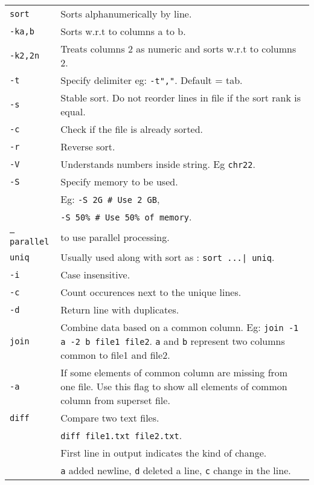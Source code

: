 \begin{tabularx}{\linewidth}{lX}
    \texttt{sort} & Sorts alphanumerically by line.\\
    \texttt{-ka,b} & Sorts w.r.t to columns a to b.\\
    \texttt{-k2,2n} & Treats columns 2 as numeric and sorts w.r.t to columns 2.\\
    \texttt{-t} & Specify delimiter eg: \texttt{-t","}. Default = tab.\\
    \texttt{-s} & Stable sort. Do not reorder lines in file if the sort rank is equal.\\
    \texttt{-c} & Check if the file is already sorted. \\
    \texttt{-r} & Reverse sort.\\
    \texttt{-V} & Understands numbers inside string. Eg \texttt{chr22}.\\
    \texttt{-S} & Specify memory to be used. \\
    & Eg: \texttt{-S 2G \# Use 2 GB}, \\ 
    & \hspace{13pt} \texttt{-S 50\% \# Use 50\% of memory}. \\
    \texttt{--parallel} & to use parallel processing.\\
    \hline
    \texttt{uniq} & Usually used along with sort as : \texttt{sort ...| uniq}.\\
    \texttt{-i} & Case insensitive.\\
    \texttt{-c} & Count occurences next to the unique lines.\\
    \texttt{-d} & Return line with duplicates.\\
    \hline
    \texttt{join} & Combine data based on a common column. Eg: \texttt{join -1 a -2 b file1 file2}. \texttt{a} and \texttt{b} represent two columns common to file1 and file2. \\
    \texttt{-a} & If some elements of common column are missing from one file. Use this flag to show all elements of common column from superset file. \\
    \hline
    \texttt{diff}           & Compare two text files.\\
                            & \texttt{diff file1.txt file2.txt}.\\
                            & First line in output indicates the kind of change.\\
                            & \texttt{a} added newline, \texttt{d} deleted a line, \texttt{c} change in the line.\\

\end{tabularx}

